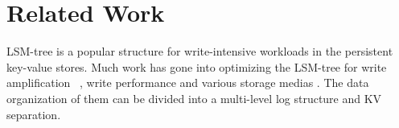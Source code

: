 \documentclass[sigconf]{acmart}
\begin{document}
\section{Related Work}
LSM-tree \cite{LSMtree} is a popular structure for write-intensive workloads in the persistent key-value stores. Much work has gone into optimizing the LSM-tree for write amplification ~\cite{VTtree,TRIAD,PebblesDB}, write performance \cite{RocksDB,FloDB,cLSM} and various storage medias \cite{LOCS,SlimDB,NoveLSM}. The data organization of them can be divided into a multi-level log structure and KV separation.
\end{document}
